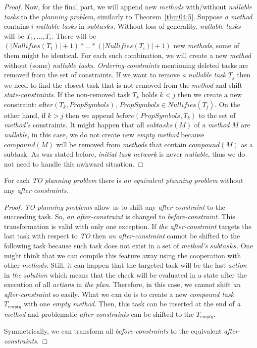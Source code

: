 \begin{proof}
    Now, for the final part, we will append new \emph{methods} with/without \emph{nullable tasks} to the \emph{planning problem}, similarly to Theorem~\ref{thm04:5}. Suppose \emph{a method} contains $i$ \emph{nullable tasks} in $subtasks$. Without loss of generality, \emph{nullable tasks} will be $T_1, \dots, T_i$. There will be $(|Nullifies(T_1)| + 1) * \dots * (|Nullifies(T_i)| + 1)$ new \emph{methods}, some of them might be identical. For each such combination, we will create a new \emph{method} without (some) \emph{nullable tasks}. \emph{Ordering-constraints} mentioning deleted tasks are removed from the set of constraints. If we want to remove \emph{a nullable task} $T_j$ then we need to find the closest task that is not removed from the \emph{method} and shift \emph{state-constraints}. If the non-removed task $T_k$ holds $k < j$ then we create a new constraint: $a\text{f}ter(T_k, PropSymbols)$, $PropSymbols \in Nullifies(T_j)$. On the other hand, if $k > j$ then we append $be\text{f}ore(PropSymbols, T_k)$ to the set of \emph{method's} constraints. It might happen that all $subtasks(M)$ of \emph{a method} $M$ are \emph{nullable}, in this case, we do not create new \emph{empty method} because $compound(M)$ will be removed from \emph{methods} that contain $compound(M)$ as a subtask. As was stated before, \emph{initial task network} is never \emph{nullable}, thus we do not need to handle this awkward situation.
\end{proof}

\begin{thm}\label{thm04:11}
    For each \emph{TO planning problem} there is \emph{an equivalent planning problem} without any \emph{after-constraints}.
\end{thm}
\begin{proof}
    \emph{TO planning problems} allow us to shift any \emph{after-constraint} to the succeeding task. So, \emph{an after-constraint} is changed to \emph{before-constraint}. This transformation is valid with only one exception. If \emph{the after-constraint} targets the last task with respect to \emph{TO} then \emph{an after-constraint} cannot be shifted to the following task because such task does not exist in a set of \emph{method's} $subtasks$. One might think that we can compile this feature away using the cooperation with other \emph{methods}. Still, it can happen that the targeted task will be the last \emph{action} in \emph{the solution} which means that the check will be evaluated in a state after the execution of all \emph{actions} in \emph{the plan}. Therefore, in this case, we cannot shift \emph{an after-constraint} so easily. What we can do is to create a new \emph{compound task} $T_{empty}$ with one \emph{empty method}. Then, this task can be inserted at the end of \emph{a method} and problematic \emph{after-constraints} can be shifted to the $T_{empty}$.

    Symmetrically, we can transform all \emph{before-constraints} to the equivalent \emph{after-constraints}.
\end{proof}

